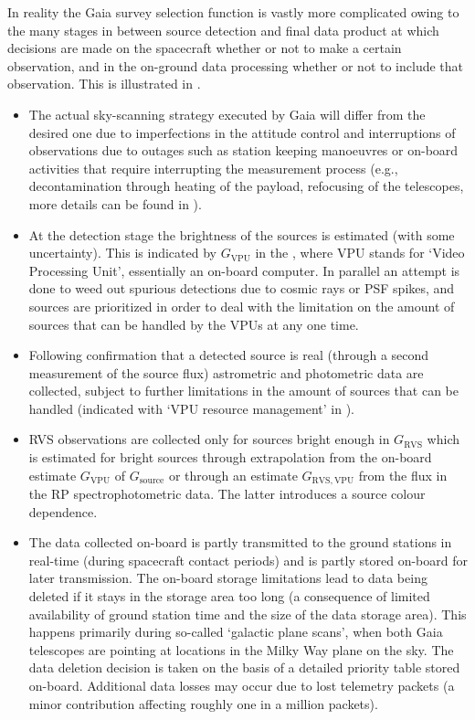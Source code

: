 In reality the Gaia survey selection function is vastly more complicated owing to the many stages in between source detection and final data product at which decisions are made on the spacecraft whether or not to make a certain observation, and in the on-ground data processing whether or not to include that observation. This is illustrated in .
\begin{itemize}
    \item The actual sky-scanning strategy executed by Gaia will differ from the desired one due to imperfections in the attitude control and interruptions of observations due to outages such as station keeping manoeuvres or on-board activities that require interrupting the measurement process (e.g., decontamination through heating of the payload, refocusing of the telescopes, more details can be found in \cite{2016A&A...595A...1G}).
    \item At the detection stage the brightness of the sources is estimated (with some uncertainty). This is indicated by $G_\mathrm{VPU}$ in the , where VPU stands for `Video Processing Unit', essentially an on-board computer. In parallel an attempt is done to weed out spurious detections due to cosmic rays or PSF spikes, and sources are prioritized in order to deal with the limitation on the amount of sources that can be handled by the VPUs at any one time.
    \item Following confirmation that a detected source is real (through a second measurement of the source flux) astrometric and photometric data are collected, subject to further limitations in the amount of sources that can be handled (indicated with `VPU resource management' in ).
    \item RVS observations are collected only for sources bright enough in $G_\mathrm{RVS}$ which is estimated for bright sources through extrapolation from the on-board estimate $G_\mathrm{VPU}$ of $G_\mathrm{source}$ or through an estimate $G_\mathrm{RVS,VPU}$ from the flux in the RP spectrophotometric data. The latter introduces a source colour dependence.
    \item The data collected on-board is partly transmitted to the ground stations in real-time (during spacecraft contact periods) and is partly stored on-board for later transmission. The on-board storage limitations lead to data being deleted if it stays in the storage area too long (a consequence of limited availability of ground station time and the size of the data storage area). This happens primarily during so-called `galactic plane scans', when both Gaia telescopes are pointing at locations in the Milky Way plane on the sky. The data deletion decision is taken on the basis of a detailed priority table stored on-board. Additional data losses may occur due to lost telemetry packets (a minor contribution affecting roughly one in a million packets).
\end{itemize}

